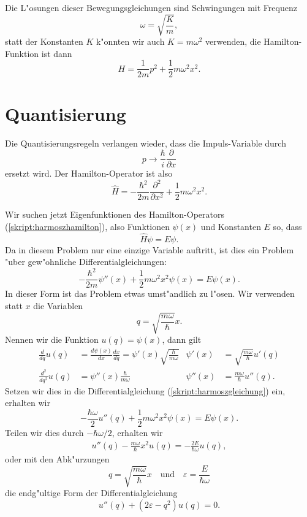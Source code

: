 Die L"osungen dieser Bewegungsgleichungen sind Schwingungen mit 
Frequenz
\[
\omega = \sqrt{\frac{K}{m}},
\]
statt der Konstanten $K$ k"onnten wir auch $K=m\omega^2$ verwenden,
die Hamilton-Funktion ist dann
\begin{equation}
H=\frac1{2m}p^2+\frac12m\omega^2x^2.
\end{equation}

\section{Quantisierung}
Die Quantisierungsregeln verlangen wieder, dass die Impuls-Variable
durch
\[
p\rightarrow\frac{\hbar}{i}\frac{\partial}{\partial x}
\]
ersetzt wird. Der Hamilton-Operator ist also
\begin{equation}
\hat H
=
-\frac{\hbar^2}{2m}
\frac{\partial^2}{\partial x^2}
+\frac12m\omega^2x^2.
\label{skript:harmoszhamilton}
\end{equation}

Wir suchen jetzt Eigenfunktionen des Hamilton-Operators (\ref{skript:harmoszhamilton}),
also Funktionen $\psi(x)$ und Konstanten $E$ so, dass
\[
\hat H\psi=E\psi.
\]
Da in diesem Problem nur eine einzige Variable auftritt, ist dies ein
Problem "uber gew"ohnliche Differentialgleichungen:
\begin{equation}
-\frac{\hbar^2}{2m} \psi''(x)+\frac12m\omega^2x^2\psi(x)=E\psi(x).
\label{skript:harmoszgleichung}
\end{equation}
In dieser Form ist das Problem etwas umst"andlich zu l"osen.
Wir verwenden statt $x$ die Variablen 
\[
q=\sqrt{\frac{m\omega}{\hbar}}x.
\]
Nennen wir die Funktion $u(q)=\psi(x)$, dann gilt
\begin{align*}
\frac{d}{dq}u(q)&=\frac{d\psi(x)}{dx}\frac{dx}{dq}
=\psi'(x)\sqrt{\frac{\hbar}{m\omega}}
&
\psi'(x)&=\sqrt{\frac{m\omega}{\hbar}}u'(q)
\\
\frac{d^2}{dq^2}u(q)&=\psi''(x)\frac{\hbar}{m\omega}
&
\psi''(x)&=\frac{m\omega}{\hbar}u''(q).
\end{align*}
Setzen wir dies in die Differentialgleichung (\ref{skript:harmoszgleichung})
ein, erhalten wir
\begin{equation}
-\frac{\hbar\omega}{2} u''(q)
+\frac12m\omega^2x^2\psi(x)=E\psi(x).
\end{equation}
Teilen wir dies durch $-\hbar\omega/2$, erhalten wir
\begin{align*}
u''(q) -\frac{m\omega}{\hbar}x^2u(q)=-\frac{2E}{\hbar\omega}u(q),
\end{align*}
oder mit den Abk"urzungen
\[
q=\sqrt{\frac{m\omega}{\hbar}}x
\quad\text{und}\quad
\varepsilon=\frac{E}{\hbar \omega}
\]
die endg"ultige Form der Differentialgleichung
\begin{equation}
u''(q)+(2\varepsilon-q^2) u(q)=0.
\label{skript:harmq}
\end{equation}

